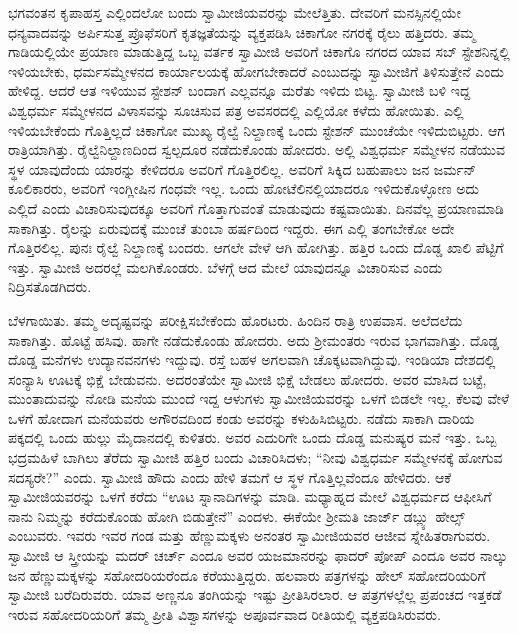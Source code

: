  ಭಗವಂತನ ಕೃಪಾಹಸ್ತ ಎಲ್ಲಿಂದಲೋ ಬಂದು ಸ್ವಾಮೀಜಿಯವರನ್ನು ಮೇಲೆತ್ತಿತು. ದೇವರಿಗೆ ಮನಸ್ಸಿನಲ್ಲಿಯೇ ಧನ್ಯವಾದವನ್ನು ಅರ್ಪಿಸುತ್ತ ಪ್ರೊಫೆಸರಿಗೆ ಕೃತಜ್ಞತೆಯನ್ನು ವ್ಯಕ್ತಪಡಿಸಿ ಚಿಕಾಗೋ ನಗರಕ್ಕೆ ರೈಲು ಹತ್ತಿದರು. ತಮ್ಮ ಗಾಡಿಯಲ್ಲಿಯೇ ಪ್ರಯಾಣ ಮಾಡುತ್ತಿದ್ದ ಒಬ್ಬ ವರ್ತಕ ಸ್ವಾಮೀಜಿ ಅವರಿಗೆ ಚಿಕಾಗೊ ನಗರದ ಯಾವ ಸಬ್ ಸ್ಟೇಶನಿನ್ನಲ್ಲಿ ಇಳಿಯಬೇಕು, ಧರ್ಮಸಮ್ಮೇಳನದ ಕಾರ್ಯಾಲಯಕ್ಕೆ ಹೋಗಬೇಕಾದರೆ ಎಂಬುದನ್ನು ಸ್ವಾಮೀಜಿಗೆ ತಿಳಿಸುತ್ತೇನೆ ಎಂದು ಹೇಳಿದ್ದ. ಆದರೆ ಆತ ಇಳಿಯುವ ಸ್ಟೇಶನ್ ಬಂದಾಗ ಎಲ್ಲವನ್ನೂ ಮರೆತು ಇಳಿದು ಬಿಟ್ಟ. ಸ್ವಾಮೀಜಿ ಬಳಿ ಇದ್ದ ವಿಶ್ವಧರ್ಮ ಸಮ್ಮೇಳನದ ವಿಳಾಸವನ್ನು ಸೂಚಿಸುವ ಪತ್ರ ಅವಸರದಲ್ಲಿ ಎಲ್ಲಿಯೋ ಕಳೆದು ಹೋಯಿತು. ಎಲ್ಲಿ ಇಳಿಯಬೇಕೆಂದು ಗೊತ್ತಿಲ್ಲದೆ ಚಿಕಾಗೋ ಮುಖ್ಯ ರೈಲ್ವೆ ನಿಲ್ದಾಣಕ್ಕೆ ಒಂದು ಸ್ಟೇಶನ್ ಮುಂಚೆಯೇ ಇಳಿದುಬಿಟ್ಟರು. ಆಗ ರಾತ್ರಿಯಾಗಿತ್ತು. ರೈಲ್ವೆ\break ನಿಲ್ದಾಣದಿಂದ ಸ್ವಲ್ಪದೂರ ನಡೆದುಕೊಂಡು ಹೋದರು. ಅಲ್ಲಿ ವಿಶ್ವಧರ್ಮ ಸಮ್ಮೇಳನ ನಡೆಯುವ ಸ್ಥಳ ಯಾವುದೆಂದು ಯಾರನ್ನು ಕೇಳಿದರೂ ಅವರಿಗೆ ಗೊತ್ತಿರಲಿಲ್ಲ. ಅವರಿಗೆ ಸಿಕ್ಕಿದ ಬಹುಪಾಲು ಜನ ಜರ್ಮನ್ ಕೂಲಿಕಾರರು, ಅವರಿಗೆ ಇಂಗ್ಲೀಷಿನ ಗಂಧವೇ ಇಲ್ಲ. ಒಂದು ಹೋಟೆಲಿನಲ್ಲಿಯಾದರೂ ಇಳಿದುಕೊಳ್ಳೋಣ ಅದು ಎಲ್ಲಿದೆ ಎಂದು ವಿಚಾರಿಸುವುದಕ್ಕೂ ಅವರಿಗೆ ಗೊತ್ತಾಗುವಂತೆ ಮಾಡುವುದು ಕಷ್ಟವಾಯಿತು. ದಿನವೆಲ್ಲ ಪ್ರಯಾಣಮಾಡಿ ಸಾಕಾಗಿತ್ತು. ರೈಲನ್ನು ಏರುವುದಕ್ಕೆ ಮುಂಚೆ ತುಂಬಾ ಹರ್ಷದಿಂದ ಇದ್ದರು. ಈಗ ಎಲ್ಲಿ ತಂಗಬೇಕೋ ಅದೇ ಗೊತ್ತಿರಲಿಲ್ಲ. ಪುನಃ ರೈಲ್ವೆ ನಿಲ್ದಾಣಕ್ಕೆ ಬಂದರು. ಆಗಲೇ ವೇಳೆ ಆಗಿ ಹೋಗಿತ್ತು. ಹತ್ತಿರ ಒಂದು ದೊಡ್ಡ ಖಾಲಿ ಪೆಟ್ಟಿಗೆ ಇತ್ತು. ಸ್ವಾಮೀಜಿ ಅದರಲ್ಲೆ ಮಲಗಿಕೊಂಡರು. ಬೆಳಗ್ಗೆ ಆದ ಮೇಲೆ ಯಾವುದನ್ನೂ ವಿಚಾರಿಸುವ ಎಂದು ನಿದ್ರಿಸತೊಡಗಿದರು. 

 ಬೆಳಗಾಯಿತು. ತಮ್ಮ ಅದೃಷ್ಟವನ್ನು ಪರೀಕ್ಷಿಸಬೇಕೆಂದು ಹೊರಟರು. ಹಿಂದಿನ ರಾತ್ರಿ ಉಪವಾಸ. ಅಲೆದಲೆದು ಸಾಕಾಗಿತ್ತು. ಹೊಟ್ಟೆ ಹಸಿವು. ಹಾಗೇ ನಡೆದುಕೊಂಡು ಹೋದರು. ಅದು ಶ‍್ರೀಮಂತರು ಇರುವ ಭಾಗವಾಗಿತ್ತು. ದೊಡ್ಡ ದೊಡ್ಡ ಮನೆಗಳು ಉದ್ಯಾನವನಗಳು ಇದ್ದುವು. ರಸ್ತೆ ಬಹಳ ಅಗಲವಾಗಿ ಚೊಕ್ಕಟವಾಗಿದ್ದುವು. ಇಂಡಿಯಾ ದೇಶದಲ್ಲಿ ಸಂನ್ಯಾಸಿ ಊಟಕ್ಕೆ ಭಿಕ್ಷೆ ಬೇಡುವನು. ಅದರಂತೆಯೇ ಸ್ವಾಮೀಜಿ ಭಿಕ್ಷೆ ಬೇಡಲು ಹೋದರು. ಅವರ ಮಾಸಿದ ಬಟ್ಟೆ, ಮುಂತಾದುವನ್ನು ನೋಡಿ ಮನೆಯ ಮುಂದೆ ಇದ್ದ ಆಳುಗಳು ಸ್ವಾಮೀಜಿಯವರನ್ನು ಒಳಗೆ ಬಿಡಲೇ ಇಲ್ಲ. ಕೆಲವು ವೇಳೆ ಒಳಗೆ ಹೋದಾಗ ಮನೆಯವರು ಅಗೌರವದಿಂದ ಕಂಡು ಅವರನ್ನು ಕಳುಹಿಸಿಬಿಟ್ಟರು. ನಡೆದು ಸಾಕಾಗಿ ದಾರಿಯ ಪಕ್ಕದಲ್ಲಿ ಒಂದು ಹುಲ್ಲು ಮೈದಾನದಲ್ಲಿ ಕುಳಿತರು. ಅವರ ಎದುರಿಗೇ ಒಂದು ದೊಡ್ಡ ಮನುಷ್ಯರ ಮನೆ ಇತ್ತು. ಒಬ್ಬ ಭದ್ರಮಹಿಳೆ ಬಾಗಿಲು ತೆರೆದು ಸ್ವಾಮೀಜಿ ಹತ್ತಿರ ಬಂದು ವಿಚಾರಿಸಿದಳು; “ನೀವು ವಿಶ್ವಧರ್ಮ ಸಮ್ಮೇಳನಕ್ಕೆ ಹೋಗುವ ಸದಸ್ಯರೇ?” ಎಂದು. ಸ್ವಾಮೀಜಿ ಹೌದು ಎಂದು ಹೇಳಿ ತಮಗೆ ಆ ಸ್ಥಳ ಗೊತ್ತಿಲ್ಲವೆಂದೂ ಹೇಳಿದರು. ಆಕೆ ಸ್ವಾಮೀಜಿಯವರನ್ನು ಒಳಗೆ ಕರೆದು “ಊಟ ಸ್ನಾನಾದಿಗಳನ್ನು ಮಾಡಿ. ಮಧ್ಯಾಹ್ನದ ಮೇಲೆ ವಿಶ್ವಧರ್ಮದ ಆಫೀಸಿಗೆ ನಾನು ನಿಮ್ಮನ್ನು ಕರೆದುಕೊಂಡು ಹೋಗಿ ಬಿಡುತ್ತೇನೆ” ಎಂದಳು. ಈಕೆಯೇ ಶ‍್ರೀಮತಿ ಜಾರ್ಜ್ ಡಬ್ಲ್ಯು ಹೇಲ್ಸ್ ಎಂಬುವರು. ಇವರು ಇವರ ಗಂಡ ಮತ್ತು ಹೆಣ್ಣುಮಕ್ಕಳು ಅನಂತರ ಸ್ವಾಮೀಜಿಯವರ ಆಜೀವ ಸ್ನೇಹಿತರಾಗುವರು. ಸ್ವಾಮೀಜಿ ಆ ಸ್ತ್ರೀಯನ್ನು ಮದರ್ ಚರ್ಚ್ ಎಂದೂ ಅವರ ಯಜಮಾನರನ್ನು ಫಾದರ್ ಪೋಪ್ ಎಂದೂ ಅವರ ನಾಲ್ಕು ಜನ ಹೆಣ್ಣುಮಕ್ಕಳನ್ನು ಸಹೋದರಿಯರೆಂದೂ ಕರೆಯುತ್ತಿದ್ದರು. ಹಲವಾರು ಪತ್ರಗಳನ್ನು ಹೇಲ್ ಸಹೋದರಿಯರಿಗೆ ಸ್ವಾಮೀಜಿ ಬರೆದಿರುವರು. ಯಾವ ಅಣ್ಣನೂ ತಂಗಿಯನ್ನು ಇಷ್ಟು ಪ್ರೀತಿಸಿರಲಾರ. ಆ ಪತ್ರಗಳಲ್ಲೆಲ್ಲ ಪ್ರಪಂಚದ ಇತ್ತಕಡೆ ಇರುವ ಸಹೋದರಿಯರಿಗೆ ತಮ್ಮ ಪ್ರೀತಿ ವಿಶ್ವಾಸಗಳನ್ನು ಅಪೂರ್ವವಾದ ರೀತಿಯಲ್ಲಿ ವ್ಯಕ್ತಪಡಿಸಿರುವರು. 

